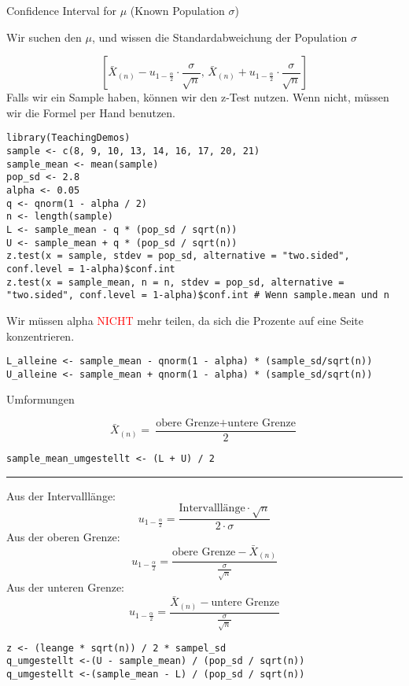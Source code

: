 \begin{multicols*}{2}

\begin{center}
     \Large{Confidence Interval for $\mu$ (Known Population $\sigma$)}
\end{center}
\begin{center}
     \Large{Wir suchen den $\mu$, und wissen die Standardabweichung der Population $\sigma$}
\end{center}

$$
\left[ \bar{X}_{(n)} - u_{1 - \frac{\alpha}{2}} \cdot \frac{\sigma}{\sqrt{n}}, \, \bar{X}_{(n)} + u_{1 - \frac{\alpha}{2}} \cdot \frac{\sigma}{\sqrt{n}} \right]
$$
Falls wir ein Sample haben, können wir den z-Test nutzen. Wenn nicht, müssen wir die Formel per Hand benutzen.
\begin{lstlisting}
library(TeachingDemos)
sample <- c(8, 9, 10, 13, 14, 16, 17, 20, 21)
sample_mean <- mean(sample)
pop_sd <- 2.8
alpha <- 0.05
q <- qnorm(1 - alpha / 2)
n <- length(sample)
L <- sample_mean - q * (pop_sd / sqrt(n))
U <- sample_mean + q * (pop_sd / sqrt(n))
z.test(x = sample, stdev = pop_sd, alternative = "two.sided", conf.level = 1-alpha)$conf.int
z.test(x = sample_mean, n = n, stdev = pop_sd, alternative = "two.sided", conf.level = 1-alpha)$conf.int # Wenn sample.mean und n 
\end{lstlisting}


Wir müssen alpha \textcolor{red}{NICHT} mehr teilen, da sich die Prozente auf eine Seite konzentrieren.
\begin{lstlisting}
L_alleine <- sample_mean - qnorm(1 - alpha) * (sample_sd/sqrt(n))
U_alleine <- sample_mean + qnorm(1 - alpha) * (sample_sd/sqrt(n))
\end{lstlisting}
\begin{center}
     \Large{Umformungen}
\end{center}
$$
\bar{X}_{(n)} = \frac{\text{obere Grenze} + \text{untere Grenze}}{2}
$$
\begin{lstlisting}
sample_mean_umgestellt <- (L + U) / 2
\end{lstlisting}

\hrule
{}

Aus der Intervalllänge:
$$u_{1 - \frac{\alpha}{2}} = \frac{\text{Intervalllänge} \cdot \sqrt{n}}{2 \cdot \sigma}$$
 Aus der oberen Grenze:
$$
u_{1 - \frac{\alpha}{2}} = \frac{\text{obere Grenze} - \bar{X}_{(n)}}{\frac{\sigma}{\sqrt{n}}}
$$
Aus der unteren Grenze:
$$
u_{1 - \frac{\alpha}{2}} = \frac{\bar{X}_{(n)} - \text{untere Grenze}}{\frac{\sigma}{\sqrt{n}}}
$$
\begin{lstlisting}
z <- (leange * sqrt(n)) / 2 * sampel_sd
q_umgestellt <-(U - sample_mean) / (pop_sd / sqrt(n))
q_umgestellt <-(sample_mean - L) / (pop_sd / sqrt(n))
\end{lstlisting}
\columnbreak
{}


\end{multicols*}

